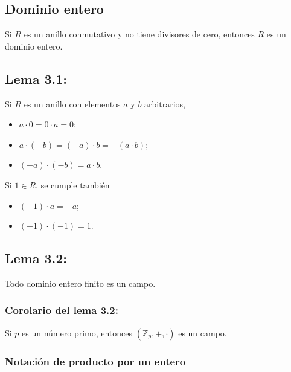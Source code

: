 \documentclass{article}
\begin{document}
\subsection*{\color{violet} Dominio entero}

Si $R$ es un anillo conmutativo y no tiene divisores de cero, entonces $R$ es un dominio entero.

\subsection*{\color{blue} Lema 3.1:}

Si $R$ es un anillo con elementos $a$ y $b$ arbitrarios,

\begin{itemize}

\item $a\cdot 0=0\cdot a=0$;

\item $a\cdot(-b)=(-a)\cdot b=-(a\cdot b)$;

\item $(-a)\cdot(-b)=a\cdot b$.

\end{itemize}

Si $1\in R$, se cumple también

\begin{itemize}

\item $(-1)\cdot a=-a$;

\item $(-1)\cdot(-1)=1$.

\end{itemize}

\subsection*{\color{blue} Lema 3.2:}

Todo dominio entero finito es un campo.

\subsubsection*{\color{blue} Corolario del lema 3.2:}

Si $p$ es un número primo, entonces $(\mathbb{Z}_p,+,\cdot)$ es un campo.

\subsubsection*{\color{teal} Notación de producto por un entero}
\end{document}
